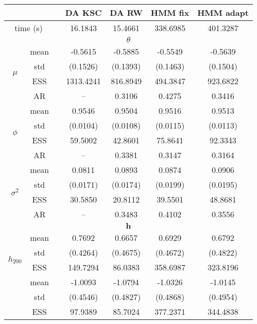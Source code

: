 { \renewcommand{\arraystretch}{1.2} 
\begin{table} 
\center 
\begin{tabular}{ccc cc cc} 
\hline 
 & && DA KSC & DA RW & HMM fix & HMM adapt \\ \hline  \hline
 \multicolumn{2}{c}{time (s)}& & 16.1843  & 15.4661  & 338.6985  & 401.3287  \\  \hline 
\multicolumn{7}{c}{$\theta$} \\ \hline 
\multirow{4}{*}{$\mu$}   & mean  &   & -0.5615  & -0.5885  & -0.5549  & -0.5639  \\ [0.75ex]
 & std  &   & (0.1526)  & (0.1393)  & (0.1463)  & (0.1504)  \\ [0.75ex]
 & ESS  &   & 1313.4241  & 816.8949  & 494.3847  & 923.6822  \\ [0.75ex]
 & AR && --  & 0.3106  & 0.4275  & 0.3416  \\ [1.3ex] 
\multirow{4}{*}{$\phi$}   & mean  &   & 0.9546  & 0.9504  & 0.9516  & 0.9513  \\ [0.75ex]
 & std  &   & (0.0104)  & (0.0108)  & (0.0115)  & (0.0113)  \\ [0.75ex]
 & ESS  &   & 59.5002  & 42.8601  & 75.8641  & 92.3343  \\ [0.75ex]
 & AR && --  & 0.3381  & 0.3147  & 0.3164  \\ [1.3ex] 
\multirow{4}{*}{$\sigma^2$}   & mean  &   & 0.0811  & 0.0893  & 0.0874  & 0.0906  \\ [0.75ex]
 & std  &   & (0.0171)  & (0.0174)  & (0.0199)  & (0.0195)  \\ [0.75ex]
 & ESS  &   & 30.5850  & 20.8112  & 39.5501  & 48.8681  \\ [0.75ex]
 & AR && --  & 0.3483  & 0.4102  & 0.3556  \\ [1.3ex] 
\hline 
\multicolumn{7}{c}{$ \bm{h} $} \\ \hline 
\multirow{4}{*}{$h_{200}$}   & mean &   & 0.7692  & 0.6657  & 0.6929  & 0.6792  \\ [0.75ex]
 & std &   & (0.4264)  & (0.4675)  & (0.4672)  & (0.4822)  \\ [0.75ex]
 & ESS  &   & 149.7294  & 86.0383  & 358.6987  & 323.8196  \\ [1.3ex] 
\multirow{4}{*}{$h_{600}$}   & mean &   & -1.0093  & -1.0794  & -1.0326  & -1.0145  \\ [0.75ex]
 & std &   & (0.4546)  & (0.4827)  & (0.4868)  & (0.4954)  \\ [0.75ex]
 & ESS  &   & 97.9389  & 85.7024  & 377.2371  & 344.4838  \\ [1.3ex] 

\end{tabular}
\end{table}}
